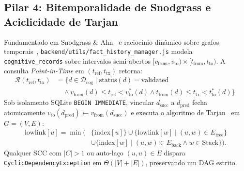 \documentclass[10pt,twocolumn]{article}
\begin{document}
\subsection{Pilar 4: Bitemporalidade de Snodgrass e Aciclicidade de Tarjan}
Fundamentado em Snodgrass \& Ahn~\cite{E12} e racioc\'inio din\^amico sobre grafos temporais~\cite{E14}, \texttt{backend/utils/fact\_history\_manager.js} modela \texttt{cognitive\_records} sobre intervalos semi-abertos $[v_{\mathrm{from}}, v_{\mathrm{to}}) \times [t_{\mathrm{from}}, t_{\mathrm{to}})$. A consulta \emph{Point-in-Time} em $(t_{\mathrm{ref}}, t_{\mathrm{tx}})$ retorna:
\begin{equation}
\begin{aligned}
\mathcal{R}(t_{\mathrm{ref}}, t_{\mathrm{tx}}) &= \bigl\{ d \in \mathcal{D}_{\mathrm{cog}} \;\big|\; \mathrm{status}(d)=\text{validated} \\
&\quad \land v_{\mathrm{from}}(d) \le t_{\mathrm{ref}} < v_{\mathrm{to}}^{*}(d) \land t_{\mathrm{from}}(d) \le t_{\mathrm{tx}} < t_{\mathrm{to}}^{*}(d) \bigr\}.
\end{aligned}
\end{equation}
Sob isolamento SQLite \texttt{BEGIN IMMEDIATE}, vincular $d_{\mathrm{succ}}$ a $d_{\mathrm{pred}}$ fecha atomicamente $v_{\mathrm{to}}(d_{\mathrm{pred}}) \leftarrow v_{\mathrm{from}}(d_{\mathrm{succ}})$ e executa o algoritmo de Tarjan~\cite{E13} em $G=(V,E)$:
\begin{equation}
\begin{aligned}
\mathrm{lowlink}[u] = \min\bigl(&\{\mathrm{index}[u]\} \cup \{\mathrm{lowlink}[w] \mid (u,w) \in E_{\mathrm{tree}}\} \\
&\cup \{\mathrm{index}[w] \mid (u,w) \in E_{\mathrm{back}} \land w \in \mathrm{Stack}\}\bigr).
\end{aligned}
\end{equation}
Qualquer SCC com $|C|>1$ ou auto-la\c{c}o $(u,u)\in E$ dispara \texttt{CyclicDependencyException} em $\Theta(|V|+|E|)$, preservando um DAG estrito.
\end{document}
